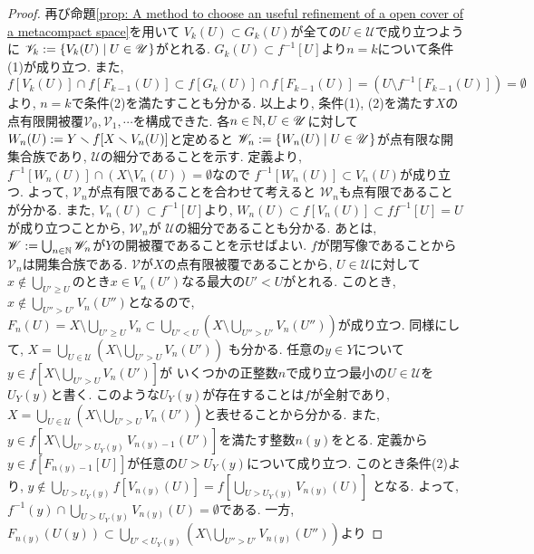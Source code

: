 \documentclass[uplatex, dvipdfmx, a4paper, 12pt, class=jsbook, crop=false]{standalone}
\begin{document}
\begin{proof}
	再び命題\ref{prop: A method to choose an useful refinement of a open cover of a metacompact space}を用いて
	$ V_k(U) \subset G_k(U) $が全ての$ U \in \mathscr{U} $で成り立つように
	$ \mathscr{V}_k \defeq \setcomp{V_k(U)}{U \in \mathscr{U}} $がとれる.
	$ G_k(U) \subset f^{-1}[U] $より$ n = k $について条件(1)が成り立つ.
	また, $ f[V_k(U)] \cap f[F_{k-1}(U)] \subset f[G_k(U)] \cap f[F_{k-1}(U)] 
	= \left(U \setminus f^{-1}[F_{k-1}(U)] \right) = \emptyset $より, 
	$ n = k $で条件(2)を満たすことも分かる.
	以上より, 条件(1), (2)を満たす$ X $の点有限開被覆$ \mathscr{V}_0, \mathscr{V}_1, \cdots $を構成できた.
	各$ n \in \mathbb{N}, U \in \mathscr{U} $に対して
	$ W_n(U) \mathrel{:=} Y \smallsetminus f[X \smallsetminus V_n(U)] $と定めると
	$ \mathscr{W}_n \defeq \setcomp{W_n(U)}{U \in \mathscr{U}} $が点有限な開集合族であり,
	$ \mathscr{U} $の細分であることを示す.
	定義より, $ f^{-1}[W_n(U)] \cap (X \setminus V_n(U)) = \emptyset $なので
	$ f^{-1}[W_n(U)] \subset V_n(U) $が成り立つ. よって, $ \mathscr{V}_n $が点有限であることを合わせて考えると
	$ \mathscr{W}_n $も点有限であることが分かる. また, $ V_n(U) \subset f^{-1}[U] $より,
	$ W_n(U) \subset f[V_n(U)] \subset ff^{-1}[U] = U $が成り立つことから, $ \mathscr{W}_n $が
	$ \mathscr{U} $の細分であることも分かる.
	あとは, $ \mathscr{W} \mathrel{:=} \bigcup_{n \in \mathbb{N}} \mathscr{W}_n $が$ Y $の開被覆であることを示せばよい.
	$ f $が閉写像であることから$ \mathscr{V}_n $は開集合族である.
	$ \mathscr{V} $が$ X $の点有限被覆であることから, $ U \in \mathscr{U} $に対して
	$ x \notin \bigcup_{U'\geq U} $のとき$ x \in V_n(U') $なる最大の$ U' < U $がとれる.
	このとき, $ x \notin \bigcup_{U'' > U'} V_n(U'') $となるので,
	$ F_n(U) = X \setminus \bigcup_{U' \geq U} V_{n} 
	\subset \bigcup_{U' < U} \left(X \setminus \bigcup_{U'' > U'} V_n(U'') \right) $が成り立つ.
	同様にして, $ X = \bigcup_{U \in \mathscr{U}}\left(X \setminus \bigcup_{U' > U}V_n(U')\right) $
	も分かる. 任意の$ y \in Y $について$ y \in f[X \setminus \bigcup_{U' > U}V_n(U')] $が
	いくつかの正整数$ n $で成り立つ最小の$ U \in \mathscr{U} $を$ U_Y(y) $と書く. 
	このような$ U_Y(y) $が存在することは$ f $が全射であり, 
	$ X = \bigcup_{U \in \mathscr{U}}\left(X \setminus \bigcup_{U' > U}V_n(U')\right) $と表せることから分かる.
	また, $ y \in f[X \setminus \bigcup_{U' > U_Y(y)} V_{n(y)-1}(U')] $を満たす整数$ n(y) $をとる.
	定義から$ y \in f[F_{n(y)-1}[U]] $が任意の$ U > U_Y(y) $について成り立つ.
	このとき条件(2)より, $ y \notin \bigcup_{U > U_Y(y)} f[V_{n(y)}(U)] = f[\bigcup_{U > U_Y(y)} V_{n(y)}(U)] $
	となる. よって, $ f^{-1}(y) \cap \bigcup_{U > U_Y(y)} V_{n(y)}(U) = \emptyset $である.
	一方, $ F_{n(y)}(U(y)) \subset \bigcup_{U' < U_Y(y)} \left(X \setminus \bigcup_{U'' > U'} V_{n(y)}(U'') \right) $より

\end{proof}
\end{document}
